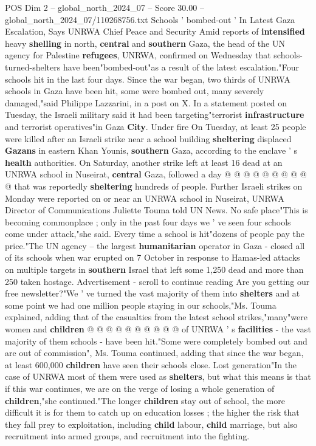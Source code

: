 \begin{textsample}{POS Dim 2 – global\_north\_2024\_07 – Score 30.00 – global\_north\_2024\_07/110268756.txt}  \label{ex:f2_pos_383}
Schools ' bombed-out ' In Latest Gaza Escalation, Says UNRWA Chief Peace and Security Amid reports of \textbf{intensified} heavy \textbf{shelling} in north, \textbf{central} and \textbf{southern} Gaza, the head of the UN agency for Palestine \textbf{refugees}, UNRWA, confirmed on Wednesday that schools-turned-shelters have been"bombed-out"as a result of the latest escalation."Four schools hit in the last four days.
Since the war began, two thirds of UNRWA schools in Gaza have been hit, some were bombed out, many severely damaged,"said Philippe Lazzarini, in a post on X.
In a statement posted on Tuesday, the Israeli military said it had been targeting"terrorist \textbf{infrastructure} and terrorist operatives"in Gaza \textbf{City}.
Under fire On Tuesday, at least 25 people were killed after an Israeli strike near a school building \textbf{sheltering} displaced \textbf{Gazans} in eastern Khan Younis, \textbf{southern} Gaza, according to the enclave ' s \textbf{health} authorities.
On Saturday, another strike left at least 16 dead at an UNRWA school in Nuseirat, \textbf{central} Gaza, followed a day @ @ @ @ @ @ @ @ @ @ that was reportedly \textbf{sheltering} hundreds of people.
Further Israeli strikes on Monday were reported on or near an UNRWA school in Nuseirat, UNRWA Director of Communications Juliette Touma told UN News.
No safe place"This is becoming commonplace ; only in the past four days we ' ve seen four schools come under attack,"she said.
Every time a school is hit"dozens of people pay the price."The UN agency -- the largest \textbf{humanitarian} operator in Gaza - closed all of its schools when war erupted on 7 October in response to Hamas-led attacks on multiple targets in \textbf{southern} Israel that left some 1,250 dead and more than 250 taken hostage.
Advertisement - scroll to continue reading Are you getting our free newsletter?"We ' ve turned the vast majority of them into \textbf{shelters} and at some point we had one million people staying in our schools,"Ms.
Touma explained, adding that of the casualties from the latest school strikes,"many"were women and \textbf{children} @ @ @ @ @ @ @ @ @ @ of UNRWA ' s \textbf{facilities} - the vast majority of them schools - have been hit."Some were completely bombed out and are out of commission", Ms.
Touma continued, adding that since the war began, at least 600,000 \textbf{children} have seen their schools close.
Lost generation"In the case of UNRWA most of them were used as \textbf{shelters}, but what this means is that if this war continues, we are on the verge of losing a whole generation of \textbf{children},"she continued."The longer \textbf{children} stay out of school, the more difficult it is for them to catch up on education losses ; the higher the risk that they fall prey to exploitation, including \textbf{child} labour, \textbf{child} marriage, but also recruitment into armed groups, and recruitment into the fighting.

\end{textsample}
